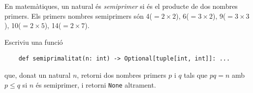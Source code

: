 

\Statement

En matemàtiques, un natural és \emph{semiprimer} si és el
producte de dos nombres primers. Els primers nombres semiprimers són
4($= 2\times2$), 6($= 3\times2$), 9($= 3\times3$), 10($= 2\times5$), 14($= 2\times7$).

\medskip

Escriviu una funció

\lstset{language=Python}
\begin{lstlisting}
    def semiprimalitat(n: int) -> Optional[tuple[int, int]]: ...
\end{lstlisting}

que, donat un natural $n$, retorni dos nombres primers $p$ i $q$ tals que $pq=n$ amb $p \le q$ si $n$ és semiprimer, i retorni \texttt{None} altrament.

